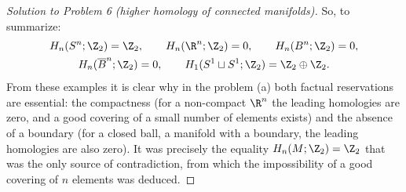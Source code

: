 \documentclass[a4paper,12pt]{report}
\begin{document}
\begin{proof}[Solution to Problem \textup{6} \textup{(}higher homology of connected manifolds\textup{)}]
So, to summarize:
\begin{gather*}
H_n(S^n;\Z_2)=\Z_2,\qquad H_n(\R^n;\Z_2)=0,\qquad H_n(B^n;\Z_2)=0,\\
H_n(\overline B^n;\Z_2)=0,\qquad H_1(S^1\sqcup S^1;\Z_2)=\Z_2\oplus\Z_2 .
\end{gather*}
From these examples it is clear why in the problem \textup{(a)} both factual reservations are essential: the compactness \textup{(}for a non-compact $\R^n$ the leading homologies are zero, and a good covering of a small number of elements exists\textup{)} and the absence of a boundary \textup{(}for a closed ball, a manifold with a boundary, the leading homologies are also zero\textup{)}. It was precisely the equality $H_n(M;\Z_2)=\Z_2$ that was the only source of contradiction, from which the impossibility of a good covering of $n$ elements was deduced.
\end{proof}
\end{document}

